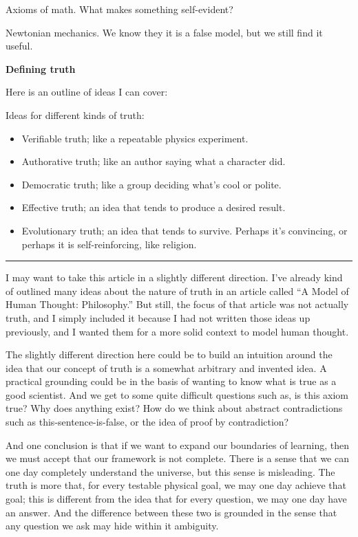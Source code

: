 \documentclass[11pt, oneside]{article}   	%
\begin{document}
Axioms of math. What makes something self-evident?

Newtonian mechanics. We know they it is a false model, but we still find it
useful.

{\bf Defining truth}

Here is an outline of ideas I can cover:

Ideas for different kinds of truth:
\begin{itemize}
    \item Verifiable truth; like a repeatable physics experiment.
    \item Authorative truth; like an author saying what a character did.
    \item Democratic truth; like a group deciding what's cool or polite.
    \item Effective truth; an idea that tends to produce a desired result.
    \item Evolutionary truth; an idea that tends to survive.
          Perhaps it's convincing, or perhaps it is self-reinforcing, like
          religion.
\end{itemize}

\bigskip
\hrule
\bigskip

I may want to take this article in a slightly different direction. I've already
kind of outlined many ideas about the nature of truth in an article called ``A
Model of Human Thought: Philosophy.'' But still, the focus of that article was
not actually truth, and I simply included it because I had not written those
ideas up previously, and I wanted them for a more solid context to model human
thought.

The slightly different direction here could be to build an intuition around the
idea that our concept of truth is a somewhat arbitrary and invented idea. A
practical grounding could be in the basis of wanting to know what is true as a
good scientist. And we get to some quite difficult questions such as, is this
axiom true? Why does anything exist? How do we think about abstract
contradictions such as this-sentence-is-false, or the idea of proof by
contradiction?

And one conclusion is that if we want to expand our boundaries of learning, then
we must accept that our framework is not complete. There is a sense that we can
one day completely understand the universe, but this sense is misleading. The
truth is more that, for every testable physical goal, we may one day achieve
that goal; this is different from the idea that for every question, we may one
day have an answer. And the difference between these two is grounded in the
sense that any question we ask may hide within it ambiguity.
\end{document}
